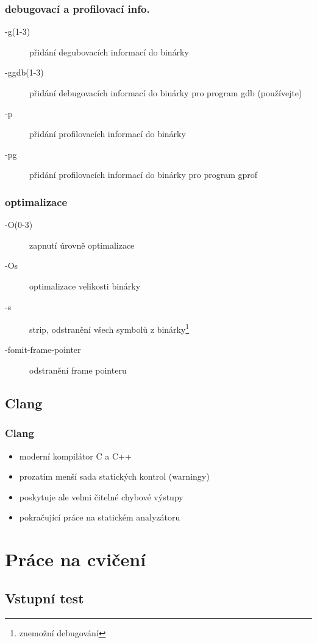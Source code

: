 	\begin{frame}
		\frametitle{debugovací a profilovací info.}
		\begin{description}
			\item[-g(1-3)]{přidání degubovacích informací do binárky}
			\item[-ggdb(1-3)]{přidání debugovacích informací do binárky pro program gdb (používejte)}
			\item[-p]{přidání profilovacích informací do binárky}
			\item[-pg]{přidání profilovacích informací do binárky pro program gprof}
		\end{description}
	\end{frame}

	\begin{frame}
		\frametitle{optimalizace}
		\begin{description}
			\item[-O(0-3)]{zapnutí úrovně optimalizace}
			\item[-Os]{optimalizace velikosti binárky}
			\item[-s]{strip, odstranění všech symbolů z binárky\footnote[1]{\alert{znemožní debugování}}}
			\item[-fomit-frame-pointer]{odstranění frame pointeru\footnotemark[1]}
		\end{description}
	\end{frame}

	\subsection{Clang}

	\begin{frame}
		\frametitle{Clang}
		\begin{itemize}
			\item{moderní kompilátor C a C++}
			\item{prozatím menší sada statických kontrol (warningy)}
			\item{poskytuje ale velmi čitelné chybové výstupy}
			\item{pokračující práce na statickém analyzátoru}
	\end{itemize}
\end{frame}

\section{Práce na cvičení}
\subsection{Vstupní test}

